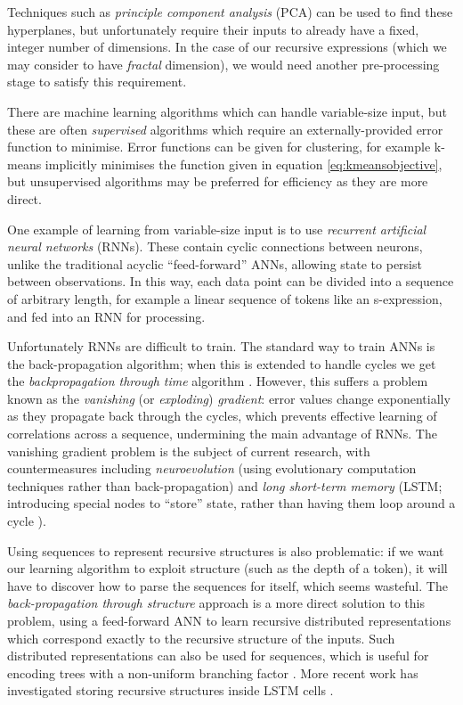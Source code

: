 Techniques such as \emph{principle component analysis} (PCA) can be used to find these hyperplanes, but unfortunately require their inputs to already have a fixed, integer number of dimensions. In the case of our recursive expressions (which we may consider to have \emph{fractal} dimension), we would need another pre-processing stage to satisfy this requirement.

There are machine learning algorithms which can handle variable-size input, but these are often \emph{supervised} algorithms which require an externally-provided error function to minimise. Error functions can be given for clustering, for example k-means implicitly minimises the function given in equation \ref{eq:kmeansobjective}, but unsupervised algorithms may be preferred for efficiency as they are more direct.

One example of learning from variable-size input is to use \emph{recurrent artificial neural networks} (RNNs). These contain cyclic connections between neurons, unlike the traditional acyclic ``feed-forward'' ANNs, allowing state to persist between observations. In this way, each data point can be divided into a sequence of arbitrary length, for example a linear sequence of tokens like an s-expression, and fed into an RNN for processing.

Unfortunately RNNs are difficult to train. The standard way to train ANNs is the back-propagation algorithm; when this is extended to handle cycles we get the \emph{backpropagation through time} algorithm \citep{werbos1990backpropagation}. However, this suffers a problem known as the \emph{vanishing} (or \emph{exploding}) \emph{gradient}: error values change exponentially as they propagate back through the cycles, which prevents effective learning of correlations across a sequence, undermining the main advantage of RNNs. The vanishing gradient problem is the subject of current research, with countermeasures including \emph{neuroevolution} (using evolutionary computation techniques rather than back-propagation) and \emph{long short-term memory} (LSTM; introducing special nodes to ``store'' state, rather than having them loop around a cycle \citep{hochreiter1997long}).

Using sequences to represent recursive structures is also problematic: if we want our learning algorithm to exploit structure (such as the depth of a token), it will have to discover how to parse the sequences for itself, which seems wasteful. The \emph{back-propagation through structure} approach \citep{goller1996learning} is a more direct solution to this problem, using a feed-forward ANN to learn recursive distributed representations \citep{pollack1990recursive} which correspond exactly to the recursive structure of the inputs. Such distributed representations can also be used for sequences, which is useful for encoding trees with a non-uniform branching factor \citep{kwasny1995tail}. More recent work has investigated storing recursive structures inside LSTM cells \citep{zhu2015long}.

